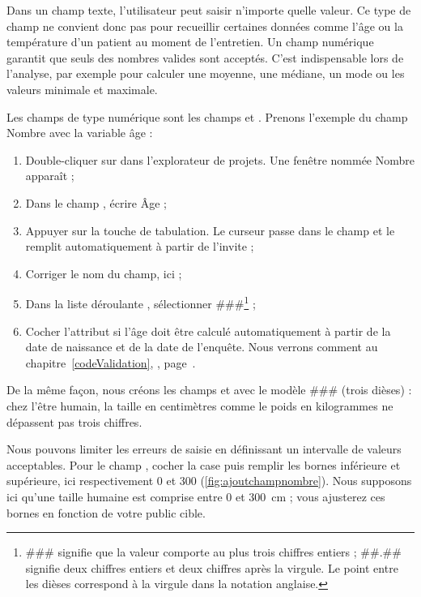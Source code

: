 Dans un champ texte, l'utilisateur peut saisir n'importe quelle valeur. Ce type de champ ne convient donc pas pour recueillir certaines données comme l'âge ou la température d'un patient au moment de l'entretien.
Un champ numérique garantit que seuls des nombres valides sont acceptés. C'est indispensable lors de l'analyse, par exemple pour calculer une moyenne, une médiane, un mode ou les valeurs minimale et maximale.

Les champs de type numérique sont les champs  et . Prenons l'exemple du champ Nombre avec la variable âge :

\begin{enumerate}
	\item Double-cliquer sur  dans l'explorateur de projets. Une fenêtre nommée Nombre apparaît ;
	\item Dans le champ , écrire \og Âge \fg{} ;
	\item Appuyer sur la touche de tabulation. Le curseur passe dans le champ  et le remplit automatiquement à partir de l'invite ;
	\item Corriger le nom du champ, ici  ;
	\item Dans la liste déroulante , sélectionner \#\#\#\footnote{\#\#\# signifie que la valeur comporte au plus trois chiffres entiers ; \#\#.\#\# signifie deux chiffres entiers et deux chiffres après la virgule. Le point entre les dièses correspond à la virgule dans la notation anglaise.} ;
	\item Cocher l'attribut  si l'âge doit être calculé automatiquement à partir de la date de naissance et de la date de l'enquête. Nous verrons comment au chapitre~\ref{codeValidation}, , page~\pageref{codeValidation}.
\end{enumerate}

De la même façon, nous créons les champs  et  avec le modèle \#\#\# (trois dièses) : chez l'être humain, la taille en centimètres comme le poids en kilogrammes ne dépassent pas trois chiffres.

Nous pouvons limiter les erreurs de saisie en définissant un intervalle de valeurs acceptables. Pour le champ , cocher la case  puis remplir les bornes inférieure et supérieure, ici respectivement 0 et 300 (\autoref{fig:ajoutchampnombre}). Nous supposons ici qu'une taille humaine est comprise entre 0 et 300~cm ; vous ajusterez ces bornes en fonction de votre public cible.

